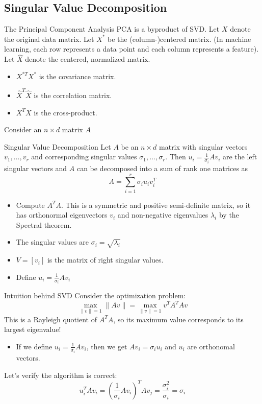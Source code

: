 \documentclass[../main]{subfiles}
\begin{document}
\subsection{Singular Value Decomposition}
The Principal Component Analysis PCA is a byproduct of SVD. Let $X$ denote the original data matrix. Let $X^*$ be the (column-)centered matrix. (In machine learning, each row represents a data point and each column represents a feature). Let $\hat X$ denote the centered, normalized matrix.
\begin{itemize}
    \item $X^{*T}X^*$ is the covariance matrix.
    \item $\hat X^T \hat X$ is the correlation matrix.
    \item $X^T X$ is the cross-product.
\end{itemize}
Consider an $n\times d$ matrix $A$
\begin{bbox}{Singular Value Decomposition}
    Let $A$ be an $n\times d$ matrix with singular vectors $v_1,\dots, v_r$ and corresponding singular values $\sigma_1,\dots, \sigma_r$. Then $u_i = \frac{1}{\sigma_i} Av_i$ are the left singular vectors and $A$ can be decomposed into a sum of rank one matrices as 
    \[
    A = \sum_{i=1}^r \sigma_i u_i v_i^T
    \]
    \begin{itemize}
        \item Compute $A^T A$. This is a symmetric and positive semi-definite matrix, so it has orthonormal eigenvectors $v_i$ and non-negative eigenvalues $\lambda_i$ by the Spectral theorem.
        \item The singular values are $\sigma_i = \sqrt{\lambda_i}$
        \item $V = [v_i]$ is the matrix of right singular values.
        \item Define $u_i = \frac{1}{\sigma_i}Av_i$
    \end{itemize}
\end{bbox}
\begin{pbox}{Intuition behind SVD}
    Consider the optimization problem:
    \[
    \max_{\|v\|=1} \|Av\| = \max_{\|v\|=1} v^T A^T Av
    \]
    This is a Rayleigh quotient of $A^T A$, so its maximum value corresponds to its largest eigenvalue!
    \begin{itemize}
        \item If we define $u_i = \frac{1}{\sigma_i}Av_i$, then we get $Av_i = \sigma_i u_i$ and $u_i$ are orthonomal vectors.
    \end{itemize}
    Let's verify the algorithm is correct:
    \[
    u_i^T A v_i = (\frac{1}{\sigma_i} Av_i)^TAv_j = \frac{\sigma_i^2}{\sigma_i} = \sigma_i
    \]
\end{pbox}
\end{document}
